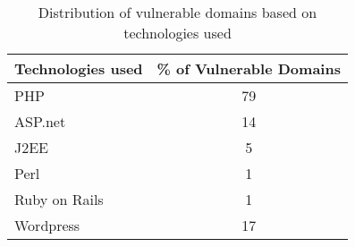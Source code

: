 \begin{table}[tbp]
	\centering
	\scriptsize
	\begin{tabular}{|l|c|}
		\hline
		Technologies used & \% of Vulnerable Domains \\
		\hline
		PHP & 79 \\
		\hline
		ASP.net & 14 \\
		\hline
		J2EE & 5 \\
		\hline
		Perl & 1 \\
		\hline
		Ruby on Rails & 1 \\
		\hline
		Wordpress & 17 \\
		\hline
	\end{tabular}
	\caption[]{Distribution of vulnerable domains based on technologies used}
	
	\label{tab:lang_used}
\end{table}
